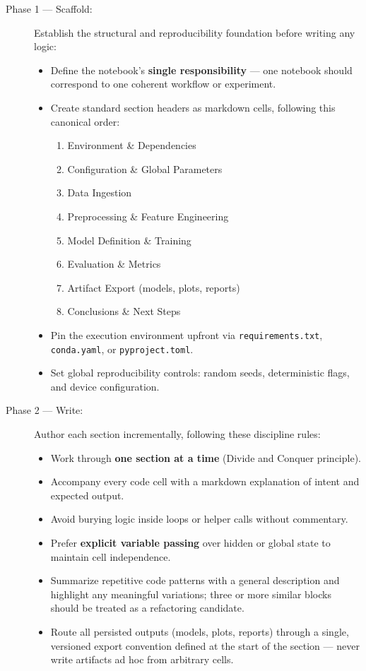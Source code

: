 \documentclass[11pt, a4paper]{article}
\begin{document}
\vspace{0.5cm}

\begin{description}
	
	\item[Phase 1 — Scaffold:]
	Establish the structural and reproducibility foundation before writing
	any logic:
	\begin{itemize}
		\item Define the notebook's \textbf{single responsibility} —
		one notebook should correspond to one coherent workflow
		or experiment.
		\item Create standard section headers as markdown cells, following
		this canonical order:
		\begin{enumerate}
			\item Environment \& Dependencies
			\item Configuration \& Global Parameters
			\item Data Ingestion
			\item Preprocessing \& Feature Engineering
			\item Model Definition \& Training
			\item Evaluation \& Metrics
			\item Artifact Export (models, plots, reports)
			\item Conclusions \& Next Steps
		\end{enumerate}
		\item Pin the execution environment upfront via
		\texttt{requirements.txt}, \texttt{conda.yaml},
		or \texttt{pyproject.toml}.
		\item Set global reproducibility controls: random seeds,
		deterministic flags, and device configuration.
	\end{itemize}
	
	\item[Phase 2 — Write:]
	Author each section incrementally, following these discipline rules:
	\begin{itemize}
		\item Work through \textbf{one section at a time}
		(Divide and Conquer principle).
		\item Accompany every code cell with a markdown explanation
		of intent and expected output.
		\item Avoid burying logic inside loops or helper calls
		without commentary.
		\item Prefer \textbf{explicit variable passing} over hidden
		or global state to maintain cell independence.
		\item Summarize repetitive code patterns with a general
		description and highlight any meaningful variations;
		three or more similar blocks should be treated as a
		refactoring candidate.
		\item Route all persisted outputs (models, plots, reports)
		through a single, versioned export convention defined at
		the start of the section — never write artifacts ad hoc
		from arbitrary cells.
	\end{itemize}
	

\end{description}
\end{document}
